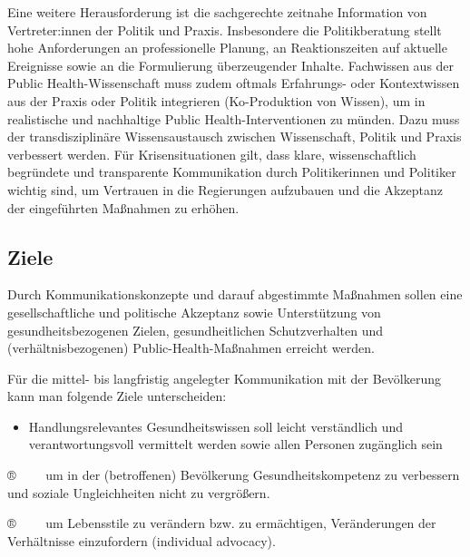 \documentclass{article}
\begin{document}
Eine weitere Herausforderung ist die sachgerechte zeitnahe Information von Vertreter:innen der Politik und Praxis. Insbesondere die Politikberatung stellt hohe Anforderungen an professionelle Planung, an Reaktionszeiten auf aktuelle Ereignisse sowie an die Formulierung überzeugender Inhalte. Fachwissen aus der Public Health-Wissenschaft muss zudem oftmals Erfahrungs- oder Kontextwissen aus der Praxis oder Politik integrieren (Ko-Produktion von Wissen), um in realistische und nachhaltige Public Health-Interventionen zu münden. Dazu muss der transdisziplinäre Wissensaustausch zwischen Wissenschaft, Politik und Praxis verbessert werden. Für Krisensituationen gilt, dass klare, wissenschaftlich begründete und transparente Kommunikation durch Politikerinnen und Politiker wichtig sind, um Vertrauen in die Regierungen aufzubauen und die Akzeptanz der eingeführten Maßnahmen zu erhöhen.


\subsection{Ziele}\label{H5689373}



Durch Kommunikationskonzepte und darauf abgestimmte Maßnahmen sollen eine gesellschaftliche und politische Akzeptanz sowie Unterstützung von gesundheitsbezogenen Zielen, gesundheitlichen Schutzverhalten und (verhältnisbezogenen) Public-Health-Maßnahmen erreicht werden. 


Für die mittel- bis langfristig angelegter Kommunikation mit der Bevölkerung kann man folgende Ziele unterscheiden: 

\begin{itemize}
\item Handlungsrelevantes Gesundheitswissen soll leicht verständlich und verantwortungsvoll vermittelt werden sowie allen Personen zugänglich sein


\end{itemize}

®     um in der (betroffenen) Bevölkerung Gesundheitskompetenz zu verbessern und soziale Ungleichheiten nicht zu vergrößern.


®     um Lebensstile zu verändern bzw. zu ermächtigen, Veränderungen der Verhältnisse einzufordern (individual advocacy).
\end{document}
